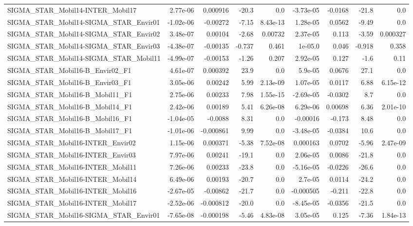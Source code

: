 \begin{tabular}{lrrrrrrrr}
SIGMA_STAR_Mobil14-INTER_Mobil17 & 2.77e-06 & 0.000916 & -20.3 & 0.0 & -3.73e-05 & -0.0168 & -21.8 & 0.0 \\
SIGMA_STAR_Mobil14-SIGMA_STAR_Envir01 & -1.02e-06 & -0.00272 & -7.15 & 8.43e-13 & 1.28e-05 & 0.0562 & -9.49 & 0.0 \\
SIGMA_STAR_Mobil14-SIGMA_STAR_Envir02 & 3.48e-07 & 0.00104 & -2.68 & 0.00732 & 2.37e-05 & 0.113 & -3.59 & 0.000327 \\
SIGMA_STAR_Mobil14-SIGMA_STAR_Envir03 & -4.38e-07 & -0.00135 & -0.737 & 0.461 & 1e-05.0 & 0.046 & -0.918 & 0.358 \\
SIGMA_STAR_Mobil14-SIGMA_STAR_Mobil11 & -4.99e-07 & -0.00153 & -1.26 & 0.207 & 2.92e-05 & 0.127 & -1.6 & 0.11 \\
SIGMA_STAR_Mobil16-B_Envir02_F1 & 4.61e-07 & 0.000392 & 23.9 & 0.0 & 5.9e-05 & 0.0676 & 27.1 & 0.0 \\
SIGMA_STAR_Mobil16-B_Envir03_F1 & 3.05e-06 & 0.00242 & 5.99 & 2.13e-09 & 1.07e-05 & 0.0117 & 6.88 & 6.15e-12 \\
SIGMA_STAR_Mobil16-B_Mobil11_F1 & 2.75e-06 & 0.00233 & 7.98 & 1.55e-15 & -2.69e-05 & -0.0302 & 8.7 & 0.0 \\
SIGMA_STAR_Mobil16-B_Mobil14_F1 & 2.42e-06 & 0.00189 & 5.41 & 6.26e-08 & 6.29e-06 & 0.00698 & 6.36 & 2.01e-10 \\
SIGMA_STAR_Mobil16-B_Mobil16_F1 & -1.04e-05 & -0.0088 & 8.31 & 0.0 & -0.00016 & -0.173 & 8.48 & 0.0 \\
SIGMA_STAR_Mobil16-B_Mobil17_F1 & -1.01e-06 & -0.000861 & 9.99 & 0.0 & -3.48e-05 & -0.0384 & 10.6 & 0.0 \\
SIGMA_STAR_Mobil16-INTER_Envir02 & 1.15e-06 & 0.000371 & -5.38 & 7.52e-08 & 0.000163 & 0.0702 & -5.96 & 2.47e-09 \\
SIGMA_STAR_Mobil16-INTER_Envir03 & 7.97e-06 & 0.00241 & -19.1 & 0.0 & 2.06e-05 & 0.0086 & -21.8 & 0.0 \\
SIGMA_STAR_Mobil16-INTER_Mobil11 & 7.26e-06 & 0.00233 & -23.8 & 0.0 & -5.16e-05 & -0.0226 & -26.6 & 0.0 \\
SIGMA_STAR_Mobil16-INTER_Mobil14 & 6.49e-06 & 0.00193 & -20.7 & 0.0 & 2.7e-05 & 0.0114 & -24.2 & 0.0 \\
SIGMA_STAR_Mobil16-INTER_Mobil16 & -2.67e-05 & -0.00862 & -21.7 & 0.0 & -0.000505 & -0.211 & -22.8 & 0.0 \\
SIGMA_STAR_Mobil16-INTER_Mobil17 & -2.52e-06 & -0.000812 & -20.0 & 0.0 & -8.45e-05 & -0.0356 & -21.5 & 0.0 \\
SIGMA_STAR_Mobil16-SIGMA_STAR_Envir01 & -7.65e-08 & -0.000198 & -5.46 & 4.83e-08 & 3.05e-05 & 0.125 & -7.36 & 1.84e-13 \\

\end{tabular}
